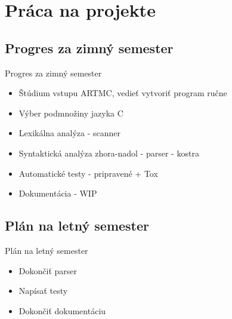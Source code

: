 \documentclass[slovak]{beamer}
\begin{document}
\section{Práca na projekte}

\subsection{Progres za zimný semester}
\begin{frame}{Progres za zimný semester}
  \begin{itemize}
  \item Štúdium vstupu ARTMC, vedieť vytvoriť program ručne
  \item Výber podmnožiny jazyka C
  \item Lexikálna analýza - scanner 
  \item Syntaktická analýza zhora-nadol - parser - kostra
  \item Automatické testy - pripravené + Tox
  \item Dokumentácia - WIP
  \end{itemize}
\end{frame}

\subsection{Plán na letný semester}
\begin{frame}{Plán na letný semester}
  \begin{itemize}
  \item Dokončiť parser
  \item Napísať testy
  \item Dokončiť dokumentáciu
  \end{itemize}
\end{frame}
\end{document}
